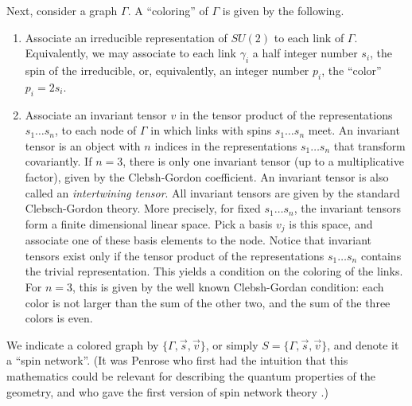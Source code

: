 Next, consider a graph $\Gamma$. A ``coloring'' of $\Gamma$ is 
given by the following. 
\begin{enumerate}
 \item Associate an irreducible representation of $SU(2)$ to each 
 link of $\Gamma$.  Equivalently, we may associate to each link 
 $\gamma_{i}$ a half integer number $s_{i}$, the spin of the 
 irreducible, or, equivalently, an integer number $p_{i}$, the 
 ``color'' $p_{i} = 2s_{i}$.  
 
 \item Associate an invariant tensor $v$ in the tensor product of 
 the representations $s_{1}\ldots s_{n}$, to each node of $\Gamma$ 
 in which links with spins $s_{1}\ldots s_{n}$ meet.  An invariant 
 tensor is an object with $n$ indices in the representations 
 $s_{1}\ldots s_{n}$ that transform covariantly.  If $n=3$, there 
 is only one invariant tensor (up to a multiplicative factor), 
 given by the Clebsh-Gordon coefficient.  An invariant tensor is 
 also called an {\it intertwining tensor}.  All invariant tensors 
 are given by the standard Clebsch-Gordon theory.  More precisely, 
 for fixed $s_{1}\ldots s_{n}$, the invariant tensors form a 
 finite dimensional linear space.  Pick a basis $v_{j}$ is this 
 space, and associate one of these basis elements to the node.  
 Notice that invariant tensors exist only if the tensor product of 
 the representations $s_{1}\ldots s_{n}$ contains the trivial 
 representation.  This yields a condition on the coloring of the 
 links.  For $n=3$, this is given by the well known Clebsh-Gordan 
 condition: each color is not larger than the sum of the other 
 two, and the sum of the three colors is even.
\end{enumerate}
We indicate a colored graph by $\{\Gamma, \vec s, \vec v\}$, or 
simply $S=\{\Gamma, \vec s, \vec v\}$, and denote it a ``spin 
network''.  (It was Penrose who first had the intuition that this 
mathematics could be relevant for describing the quantum 
properties of the geometry, and who gave the first version of 
spin network theory \cite{Penrose2,Penrose}.)

